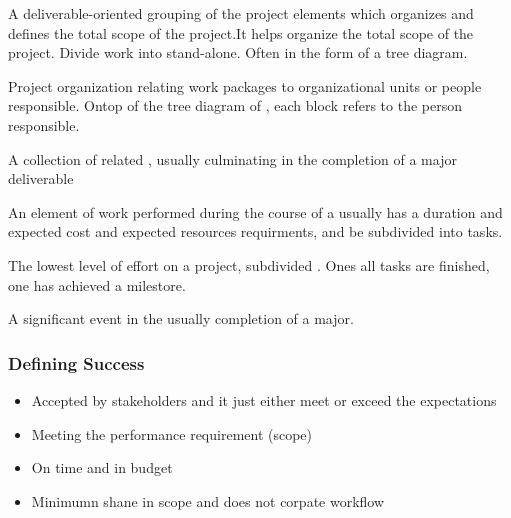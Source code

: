 \documentclass[english, 11pt]{article}
\begin{document}
      \begin{defn}\label{wbs}
        A deliverable-oriented grouping of the project elements which organizes and defines the total scope of the project.It helps organize the total scope of the project. Divide work into stand-alone. Often in the form of a tree diagram.
      \end{defn}

      \begin{defn}\label{obs}
        Project organization relating work packages to organizational units or people responsible. Ontop of the tree diagram of , each block refers to the person responsible.
      \end{defn}

      \begin{defn}\label{project phase}
        A collection of related , usually culminating in the completion of a major deliverable
      \end{defn}

      \begin{defn}[Activity]\label{activity}
        An element of work performed during the course of a  usually has a duration and expected cost and expected resources requirments, and be subdivided into tasks.
      \end{defn}

      \begin{defn}[Task]\label{task}
        The lowest level of effort on a project, subdivided . Ones all tasks are finished, one has achieved a milestore.
      \end{defn}

      \begin{defn}[Milestone]\label{milestone}
        A significant event in the  usually completion of a major.
      \end{defn}

      \subsubsection{Defining Success}
      \begin{itemize}
        \item Accepted by stakeholders and it just either meet or exceed the expectations
        \item Meeting the performance requirement (scope)
        \item On time and in budget
        \item Minimumn shane in scope and does not corpate workflow
      \end{itemize}
\end{document}
